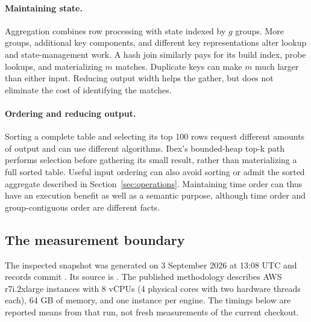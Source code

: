 \paragraph{Maintaining state.}
Aggregation combines row processing with state indexed by $g$ groups. More
groups, additional key components, and different key representations alter
lookup and state-management work. A hash join similarly pays for its build
index, probe lookups, and materializing $m$ matches. Duplicate keys can make
$m$ much larger than either input. Reducing output width helps the gather,
but does not eliminate the cost of identifying the matches.

\paragraph{Ordering and reducing output.}
Sorting a complete table and selecting its top 100 rows request different
amounts of output and can use different algorithms. Ibex's bounded-heap top-k
path performs selection before gathering its small result, rather than
materializing a full sorted table. Useful input ordering can also avoid
sorting or admit the sorted aggregate described in Section~\ref{sec:operations}.
Maintaining time order can thus have an execution benefit as well as a semantic
purpose, although time order and group-contiguous order are different facts.


\subsection{The measurement boundary}
The inspected  snapshot was generated on
3 September 2026 at 13:08 UTC and records commit
. Its source is
.
The published methodology describes AWS r7i.2xlarge instances with 8 vCPUs
(4 physical cores with two hardware threads each), 64 GB of memory, and one
instance per engine. The timings below are reported means from that run,
not fresh measurements of the current checkout.

